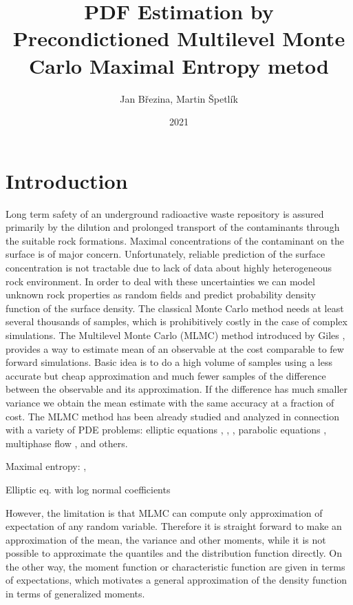 \documentclass{article}
\title{PDF Estimation by \\Precondictioned Multilevel Monte Carlo
Maximal Entropy metod}
\author{Jan Březina, Martin Špetlík}
\date{2021}
\begin{document}
\maketitle

\section{Introduction}
Long term safety of an underground radioactive waste repository is assured primarily by the dilution and 
prolonged transport of the contaminants through the suitable rock formations. Maximal concentrations of the contaminant on the surface is of major concern. Unfortunately, reliable prediction of the surface concentration is not tractable due to lack of data about highly heterogeneous rock environment. In order to deal with these uncertainties we can model unknown rock properties as random fields and predict probability density function of the surface density. 
The classical Monte Carlo method needs at least several thousands of samples, which is prohibitively costly in the case of complex simulations. The Multilevel Monte Carlo (MLMC) method introduced by Giles \cite{Giles2008}, \cite{Giles2015} provides a way to estimate mean of an observable at the cost comparable to few forward simulations. Basic idea is to do a high volume of samples using a less accurate but cheap approximation and much fewer samples of the difference between the observable and its approximation. If the difference has much smaller variance we obtain the mean estimate with the same accuracy at a fraction of cost.  The MLMC method has been already studied and analyzed in connection with a variety of PDE problems: elliptic equations \cite{Barth2011a}, \cite{Cliffe2011a}, \cite{Abdulle2013}, parabolic equations \cite{Barth2013},
multiphase flow \cite{Muller2013}, \cite{Lu2016} and others.


Maximal entropy:
\cite{Barron1991}, \cite{Bierig2016a}

Elliptic eq. with log normal coefficients \cite{Graham2015}






 However, the limitation is that MLMC can compute only approximation of expectation of any random variable. Therefore it is straight forward to make an approximation of the mean, the variance and other moments, while it is not possible to approximate the quantiles and the distribution function directly. On the other way, the moment function or characteristic function are given in terms of expectations, which motivates a general approximation of the density function in terms of generalized moments.
\end{document}
